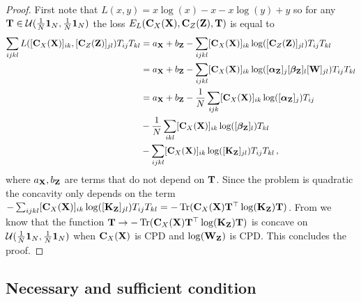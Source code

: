 \begin{proof}
	First note that $L(x,y) = x \log(x)-x - x \log(y) +y$ so for any ${\mathbf{T}} \in {\mathcal{U}}(\frac{1}{N}\bm{1}_N, \frac{1}{N}\bm{1}_N)$ the loss $E_{L}({\mathbf{C}}_{X}({\mathbf{X}}), {\mathbf{C}}_{Z}({\mathbf{Z}}), {\mathbf{T}})$ is equal to
	\begin{equation}
		\begin{split}
			\sum_{ijkl} L([{\mathbf{C}}_{X}({\mathbf{X}})]_{ik}, [{\mathbf{C}}_{Z}({\mathbf{Z}})]_{jl}) T_{ij} T_{kl} &= a_{\mathbf{X}}+ b_{\mathbf{Z}} - \sum_{ijkl} [{\mathbf{C}}_{X}({\mathbf{X}})]_{ik}\log([{\mathbf{C}}_{Z}({\mathbf{Z}})]_{jl}) T_{ij} T_{kl} \\
			&=a_{\mathbf{X}}+ b_{\mathbf{Z}} - \sum_{ijkl} [{\mathbf{C}}_{X}({\mathbf{X}})]_{ik}\log([\boldsymbol\alpha_{\mathbf{Z}}]_j [\boldsymbol\beta_{\mathbf{Z}}]_l [{\mathbf{W}}]_{jl}) T_{ij} T_{kl} \\
			&=a_{\mathbf{X}}+ b_{\mathbf{Z}} - \frac{1}{N}\sum_{ijk} [{\mathbf{C}}_{X}({\mathbf{X}})]_{ik}\log([\boldsymbol\alpha_{\mathbf{Z}}]_j) T_{ij}  \\
			&- \frac{1}{N} \sum_{ikl} [{\mathbf{C}}_{X}({\mathbf{X}})]_{ik}\log([\boldsymbol\beta_{\mathbf{Z}}]_l) T_{kl}\\
			&-\sum_{ijkl} [{\mathbf{C}}_{X}({\mathbf{X}})]_{ik}\log([{\mathbf{K}}_{\mathbf{Z}}]_{jl}) T_{ij} T_{kl}\,,
		\end{split}
	\end{equation}
	where $a_{\mathbf{X}}, b_{\mathbf{Z}}$ are terms that do not depend on ${\mathbf{T}}$. Since the problem is quadratic the concavity only depends on the term $-\sum_{ijkl} [{\mathbf{C}}_{X}({\mathbf{X}})]_{ik}\log([{\mathbf{K}}_{\mathbf{Z}}]_{jl}) T_{ij} T_{kl} = -\operatorname{Tr}({\mathbf{C}}_{X}({\mathbf{X}}) {\mathbf{T}}^\top \log({\mathbf{K}}_{\mathbf{Z}}) {\mathbf{T}})$. From \cite{maron2018probably} we know that the function ${\mathbf{T}} \to -\operatorname{Tr}({\mathbf{C}}_{X}({\mathbf{X}}) {\mathbf{T}}^\top \log({\mathbf{K}}_{\mathbf{Z}}) {\mathbf{T}})$ is concave on ${\mathcal{U}}(\frac{1}{N} \bm{1}_N, \frac{1}{N} \bm{1}_N)$ when ${\mathbf{C}}_{X}({\mathbf{X}})$ is CPD and $\log({\mathbf{W}}_{\mathbf{Z}})$ is CPD. This concludes the proof.	
\end{proof}

\subsection{Necessary and sufficient condition \label{sec:necessary_and_sufficient}}

